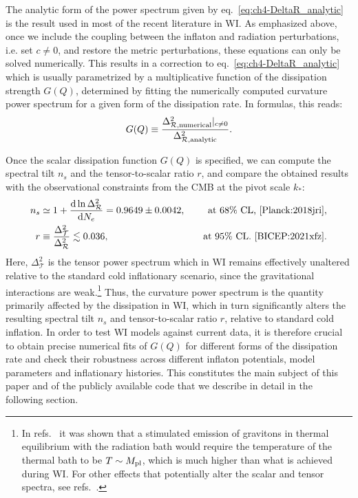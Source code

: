 The analytic form of the power spectrum given by eq.~\eqref{eq:ch4-DeltaR_analytic} is the result used in most of the recent literature in WI. As emphasized above, once we include the coupling between the inflaton and
radiation perturbations, i.e. set $c\neq 0$, and restore the metric perturbations, these equations can only be solved numerically. This results in a correction to eq.~\eqref{eq:ch4-DeltaR_analytic} which is usually parametrized by a multiplicative function
of the dissipation strength $G(Q)$, determined by fitting the
numerically computed curvature power spectrum for a
given form of the dissipation rate. In formulas, this reads:
\begin{equation}
    G(Q)\equiv \frac{\Delta_{\mathcal{R},\rm{numerical}}^2|_{c\neq 0}}{\Delta_{\mathcal{R},\rm{analytic}}^2}. \label{eq:ch4-GQ_definition}
\end{equation}

Once the scalar dissipation function $G(Q)$ is specified, we can compute the spectral tilt $n_s$ and the tensor-to-scalar ratio $r$, and compare the obtained results with the observational constraints from the CMB at the pivot scale $k_*$: 
\begin{align}
    n_s&\simeq 1+\frac{{\rm d}\ln \Delta^2_{\mathcal{R}}}{{\rm d}N_e}= 0.9649\pm 0.0042,& \quad \text{at 68\% CL,~\cite{Planck:2018jri}} \label{eq:ch4-ns_Planck}, \\
   r &\equiv \frac{\Delta_{\mathcal{T}}^2}{\Delta^2_{\mathcal{R}}}\lesssim 0.036, & \quad \text{at 95\% CL.~\cite{BICEP:2021xfz}}. \label{eq:ch4-r_Planck}
\end{align}
Here, $\Delta_{\mathcal{T}}^2$ is the tensor power spectrum which in WI remains effectively unaltered relative to the standard cold inflationary scenario, since the gravitational interactions are weak.\footnote{In refs.~\cite{Bhattacharya:2006dm,Qiu:2021ytc} it was shown that a stimulated emission of gravitons in thermal equilibrium with the radiation bath  would require the temperature of the thermal bath to be $T \sim M_{\rm pl}$, which is much higher than what is achieved during WI. For other effects that potentially alter the scalar and tensor spectra, see refs.~\cite{Namba:2015gja,Peloso:2016gqs}. }  Thus, the curvature power spectrum is the quantity primarily affected by the dissipation in WI, which in turn significantly alters the resulting spectral tilt $n_s$ and tensor-to-scalar ratio $r$, relative to standard cold inflation. In order to test WI models against current data, it is therefore  crucial to obtain precise numerical fits of $G(Q)$ for different forms of the dissipation rate and check their robustness across different inflaton potentials, model parameters and inflationary histories. This constitutes the main subject of this paper and of the publicly available code that we describe in detail in the following section.

